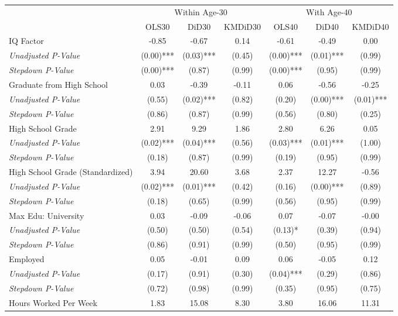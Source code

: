 \begin{tabular}{l c c c c c c}
\toprule
& \multicolumn{3}{c}{Within Age-30} & \multicolumn{3}{c}{With Age-40} \\\cmidrule(lr){2-4} \cmidrule(lr){5-7}
 & OLS30 & DiD30 & KMDiD30 & OLS40 & DiD40 & KMDiD40 \\
\midrule
IQ Factor & -0.85 & -0.67 & 0.14 & -0.61 & -0.49 & 0.00 \\
\quad \textit{Unadjusted P-Value} & (0.00)*** & (0.03)*** & (0.45) & (0.00)*** & (0.01)*** & (0.99) \\
\quad \textit{Stepdown P-Value} & (0.00)*** & (0.87) & (0.99) & (0.00)*** & (0.95) & (0.99) \\
Graduate from High School & 0.03 & -0.39 & -0.11 & 0.06 & -0.56 & -0.25 \\
\quad \textit{Unadjusted P-Value} & (0.55) & (0.02)*** & (0.82) & (0.20) & (0.00)*** & (0.01)*** \\
\quad \textit{Stepdown P-Value} & (0.86) & (0.87) & (0.99) & (0.56) & (0.80) & (0.25) \\
High School Grade & 2.91 & 9.29 & 1.86 & 2.80 & 6.26 & 0.05 \\
\quad \textit{Unadjusted P-Value} & (0.02)*** & (0.04)*** & (0.56) & (0.03)*** & (0.01)*** & (1.00) \\
\quad \textit{Stepdown P-Value} & (0.18) & (0.87) & (0.99) & (0.19) & (0.95) & (0.99) \\
High School Grade (Standardized) & 3.94 & 20.60 & 3.68 & 2.37 & 12.27 & -0.56 \\
\quad \textit{Unadjusted P-Value} & (0.02)*** & (0.01)*** & (0.42) & (0.16) & (0.00)*** & (0.89) \\
\quad \textit{Stepdown P-Value} & (0.18) & (0.65) & (0.99) & (0.56) & (0.95) & (0.99) \\
Max Edu: University & 0.03 & -0.09 & -0.06 & 0.07 & -0.07 & -0.00 \\
\quad \textit{Unadjusted P-Value} & (0.50) & (0.50) & (0.54) & (0.13)* & (0.39) & (0.94) \\
\quad \textit{Stepdown P-Value} & (0.86) & (0.91) & (0.99) & (0.50) & (0.95) & (0.99) \\
Employed & 0.05 & -0.01 & 0.09 & 0.06 & -0.05 & 0.12 \\
\quad \textit{Unadjusted P-Value} & (0.17) & (0.91) & (0.30) & (0.04)*** & (0.29) & (0.86) \\
\quad \textit{Stepdown P-Value} & (0.72) & (0.98) & (0.99) & (0.35) & (0.95) & (0.75) \\
Hours Worked Per Week & 1.83 & 15.08 & 8.30 & 3.80 & 16.06 & 11.31 \\

\end{tabular}
